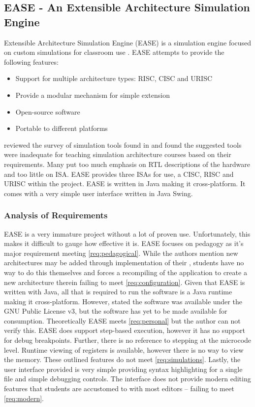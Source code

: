 \subsection{EASE - An Extensible Architecture Simulation Engine}
\label{sec:review-ease}

Extensible Architecture Simulation Engine (EASE) is a simulation engine focused on custom simulations for classroom use \cite{Skillen2011}. EASE attempts to provide the following features: 
\begin{itemize}
    \item Support for multiple architecture types: RISC, CISC and URISC
    \item Provide a modular mechanism for simple extension
    \item Open-source software
    \item Portable to different platforms
\end{itemize}
\cite{Skillen2011} reviewed the survey of simulation tools found in \cite{Nikolic2009} and found the suggested tools were inadequate for teaching simulation architecture courses based on their requirements. Many put too much emphasis on RTL descriptions of the hardware and too little on ISA. EASE provides three ISAs for use, a CISC, RISC and URISC within the project. EASE is written in Java making it cross-platform. It comes with a very simple user interface written in Java Swing. 

\subsubsection*{Analysis of Requirements}

EASE is a very immature project without a lot of proven use. Unfortunately, this makes it difficult to gauge how effective it is. EASE focuses on pedagogy as it's major requirement meeting \cref{req:pedagogical}. While the authors mention new architectures may be added through implementation of their , students have no way to do this themselves and forces a recompiling of the application to create a new architecture therein failing to meet \cref{req:configuration}. Given that EASE is written with Java, all that is required to run the software is a Java runtime making it cross-platform. However, \cite{Skillen2011} stated the software was available under the GNU Public License v3, but the software has yet to be made available for consumption. Theoretically EASE meets \cref{req:personal} but the author can not verify this. EASE does support step-based execution, however it has no support for debug breakpoints. Further, there is no reference to stepping at the microcode level. Runtime viewing of registers is available, however there is no way to view the memory. These outlined features do not meet \cref{req:simulations}. Lastly, the user interface provided is very simple providing syntax highlighting for a single file and simple debugging controls. The interface does not provide modern editing features that students are accustomed to with most editors -- failing to meet \cref{req:modern}.

